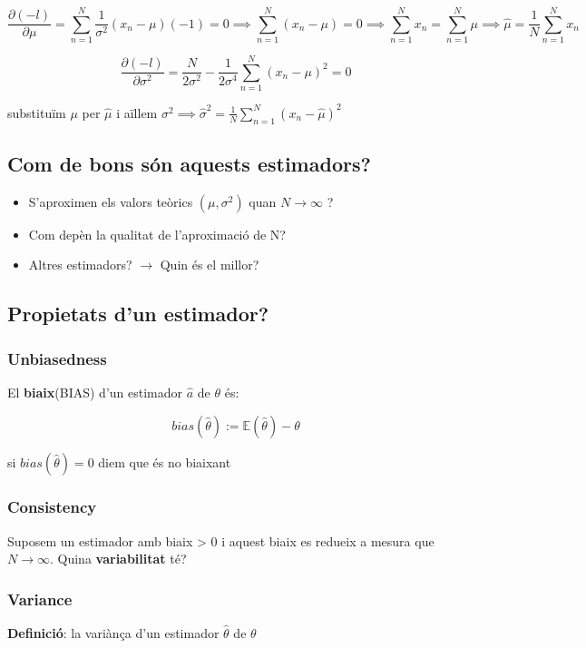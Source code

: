 \documentclass[a4paper]{article}
\begin{document}
\[ \frac{\partial(-l)}{\partial\mu} = \sum_{n=1}^N \frac{1}{\sigma^2} (x_n-\mu)(-1) = 0 \implies \sum_{n=1}^N (x_n - \mu) = 0 \implies  \sum_{n=1}^N x_n = \sum_{n=1}^N \mu \implies \boxed{\hat{\mu} = \frac{1}{N}\sum_{n=1}^N x_n}  \]

\[\frac{\partial(-l)}{\partial\sigma^2} = \frac{N}{2\sigma^2} - \frac{1}{2\sigma^4}\sum_{n=1}^N (x_n - \mu)^2 = 0 \]

substituïm $\mu$ per $\hat{\mu}$ i aïllem $\sigma^2 \implies \hat{\sigma}^2 = \frac{1}{N} \sum_{n=1}^N (x_n - \hat{\mu})^2$ 


\subsection{Com de bons són aquests estimadors?}

\begin{itemize}
	\item S'aproximen els valors teòrics $(\mu, \sigma^2)$ quan $N\rightarrow\infty$ ?
	\item Com depèn la qualitat de l'aproximació de N?
	\item Altres estimadors? $\rightarrow$ Quin és el millor?
\end{itemize}

\subsection{Propietats d'un estimador?}

\subsubsection{Unbiasedness}
	
	El \textbf{biaix}(BIAS) d'un estimador $\hat{a}$ de $\theta$ és:
	
	\[ bias(\hat{\theta}) := \mathbb{E}(\hat{\theta}) - \theta \]
	
	si $bias(\hat{\theta}) = 0$ diem que és no biaixant
	
\subsubsection{Consistency}
	Suposem un estimador amb biaix > 0 i aquest biaix es redueix a mesura que $N\rightarrow\infty$. Quina \textbf{variabilitat} té?

\subsubsection{Variance}
\textbf{Definició}: la variànça d'un estimador $\hat{\theta}$ de $\theta$
\end{document}
